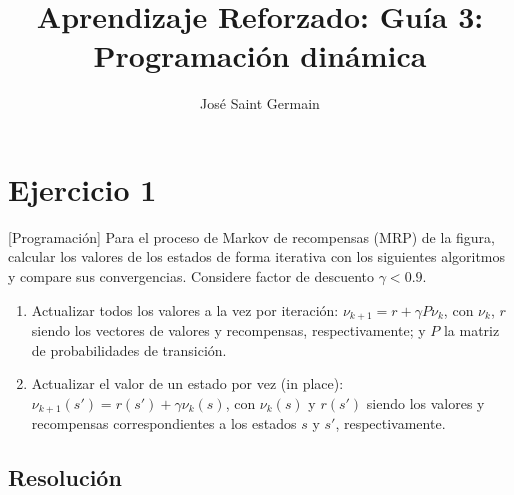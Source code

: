 \documentclass[12pt,a4paper]{article}
\title{Aprendizaje Reforzado: Guía 3: Programación dinámica}
\author{José Saint Germain}
\begin{document}
\maketitle

\section{Ejercicio 1}

[Programación] Para el proceso de Markov de recompensas (MRP) de la figura,
calcular los valores de los estados  de  forma  iterativa  con  los siguientes 
algoritmos y compare sus convergencias. Considere factor de descuento 
$\gamma <0.9$.

\begin{enumerate}
  \item Actualizar todos los valores a la vez por iteración: $\nu_{k+1} = r + \gamma P \nu_k$, 
  con $\nu_k$, $r$ siendo los  vectores  de  valores  y  recompensas, respectivamente; y $P$ 
  la matriz de probabilidades de transición.
  \item Actualizar el valor de un estado por vez (in place): $\nu_{k+1}(s') = r(s') + \gamma\nu_k(s)$, 
  con $\nu_k(s)$ y $r(s')$ siendo los  valores  y  recompensas correspondientes a los estados 
  $s$ y $s'$, respectivamente.
\end{enumerate}

\subsection{Resolución}
\end{document}
